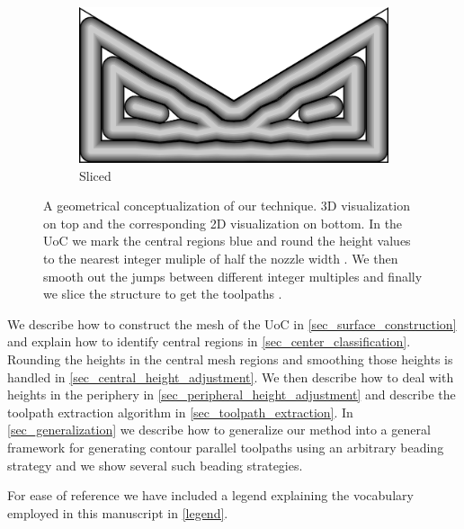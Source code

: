 \begin{figure}
\begin{subfigure}{\figwidth}
\includegraphics[width=\figwidthTwo]{sources/method/surface/sliced_2D.png}
\caption{Sliced}\label{3d_surface_overview_sliced}
\end{subfigure}
\caption{
A geometrical conceptualization of our technique.
3D visualization on top and the corresponding 2D visualization on bottom.
In the UoC 
we mark the central regions blue 
and round the height values to the nearest integer muliple of half the nozzle width .
We then smooth out the jumps between different integer multiples 
and finally we slice the structure to get the toolpaths .
}
\label{3d_surface_overview}
\end{figure}


We describe how to construct the mesh of the UoC in \cref{sec_surface_construction} and
explain how to identify central regions in \cref{sec_center_classification}.
Rounding the heights in the central mesh regions and smoothing those heights is handled in \cref{sec_central_height_adjustment}.
We then describe how to deal with heights in the periphery in \cref{sec_peripheral_height_adjustment}
and describe the toolpath extraction algorithm in \cref{sec_toolpath_extraction}.
In \cref{sec_generalization} we describe how to generalize our method into a general framework for generating contour parallel toolpaths using an arbitrary beading strategy and we show several such beading strategies.


For ease of reference we have included a legend explaining the vocabulary employed in this manuscript in \cref{legend}.

